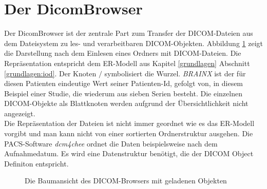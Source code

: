 \FloatBarrier
\section{Der DicomBrowser} \label{treestructure}
Der DicomBrowser ist der zentrale Part zum Transfer der DICOM-Dateien aus dem Dateisystem zu les- und verarbeitbaren DICOM-Objekten. Abbildung \ref{dicombrowser} zeigt die Darstellung nach dem Einlesen eines Ordners mit DICOM-Dateien. Die Repräsentation entspricht dem ER-Modell aus Kapitel \ref{grundlagen} Abschnitt \ref{grundlagen:iod}. Der Knoten $/$ symbolisiert die Wurzel. \textit{BRAINX} ist der für diesen Patienten eindeutige Wert seiner Patienten-Id, gefolgt von, in diesem Beispiel einer Studie, die wiederum aus sieben Serien besteht. Die einzelnen DICOM-Objekte als Blattknoten werden aufgrund der Übersichtlichkeit nicht angezeigt.\\
Die Repräsentation der Dateien ist nicht immer geordnet wie es das ER-Modell vorgibt und man kann nicht von einer sortierten Ordnerstruktur ausgehen. Die PACS-Software \textit{dcm4chee} ordnet die Daten beispielsweise nach dem Aufnahmedatum. Es wird eine Datenstruktur benötigt, die der DICOM Object Definiton entspricht.

\begin{figure}[htbp]
  \vspace{0.5cm}
  \centering
   \caption{Die Baumansicht des DICOM-Browsers mit geladenen Objekten}
  \label{dicombrowser}
  \vspace{0.5cm}
\end{figure}

